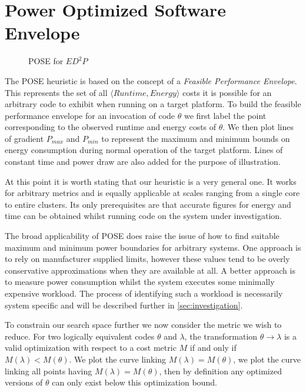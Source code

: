 \section{Power Optimized Software Envelope}
\label{sec:pose}

\begin{figure}
\centering

\caption{POSE for $ED^2P$}
\label{fig:technique}
\end{figure}

The POSE heuristic is based on the concept of a \emph{Feasible Performance Envelope}.
This represents the set of all $\langle Runtime, Energy\rangle$ costs it is possible for an arbitrary code to exhibit when running on a target platform.
To build the feasible performance envelope for an invocation of code $\theta$ we first label the point corresponding to the observed runtime and energy costs of $\theta$.
We then plot lines of gradient $P_{max}$ and $P_{min}$ to represent the maximum and minimum bounds on energy consumption during normal operation of the target platform.
Lines of constant time and power draw are also added for the purpose of illustration.

At this point it is worth stating that our heuristic is a very general one.
It works for arbitrary metrics and is equally applicable at scales ranging from a single core to entire clusters.
Its only prerequisites are that accurate figures for energy and time can be obtained whilst running code on the system under investigation.

The broad applicability of POSE does raise the issue of how to find suitable maximum and minimum power boundaries for arbitrary systems. 
One approach is to rely on manufacturer supplied limits, however these values tend to be overly conservative approximations when they are available at all.
A better approach is to measure power consumption whilst the system executes some minimally expensive workload. 
The process of identifying such a workload is necessarily system specific and will be described further in \autoref{sec:investigation}.

To constrain our search space further we now consider the metric we wish to reduce.
For two logically equivalent codes $\theta$ and $\lambda$, the transformation $\theta \to \lambda$ is a valid optimization with respect to a cost metric $M$ if and only if $M(\lambda) < M(\theta)$.
We plot the curve linking $M(\lambda) = M(\theta)$,
 we plot the curve linking all points having $M(\lambda) = M(\theta)$, then by definition any optimized versions of $\theta$ can only exist below this optimization bound.

